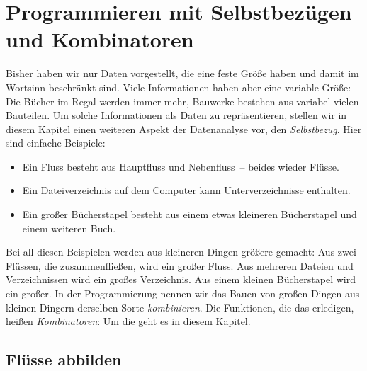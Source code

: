
\chapter{Programmieren mit Selbstbezügen und Kombinatoren}
\label{cha:selbstbezug}

Bisher haben wir nur Daten vorgestellt, die
eine feste Größe haben und damit im Wortsinn beschränkt sind.  Viele
Informationen haben aber eine variable Größe: Die Bücher im Regal werden
immer mehr, Bauwerke bestehen aus variabel vielen Bauteilen.  Um
solche Informationen als Daten zu repräsentieren, stellen wir in
diesem Kapitel einen weiteren Aspekt der Datenanalyse vor, den
\textit{Selbstbezug}.  Hier sind einfache
Beispiele:
%
\begin{itemize}
\item Ein Fluss besteht aus Hauptfluss und Nebenfluss~-- beides wieder
  Flüsse.
\item Ein Dateiverzeichnis auf dem Computer kann 
  Unterverzeichnisse enthalten.
\item Ein großer Bücherstapel besteht aus einem etwas kleineren
  Bücherstapel und einem weiteren Buch.
\end{itemize}
%
Bei all diesen Beispielen werden aus kleineren Dingen größere gemacht:
Aus zwei Flüssen, die zusammenfließen, wird ein großer Fluss.  Aus
mehreren Dateien und Verzeichnissen wird ein großes Verzeichnis.  Aus
einem kleinen Bücherstapel wird ein großer.  In der Programmierung
nennen wir das Bauen von großen Dingen aus kleinen Dingern derselben
Sorte \textit{kombinieren}. Die Funktionen, die das erledigen, heißen
\textit{Kombinatoren}: Um die geht es in diesem Kapitel.

\section{Flüsse abbilden}


